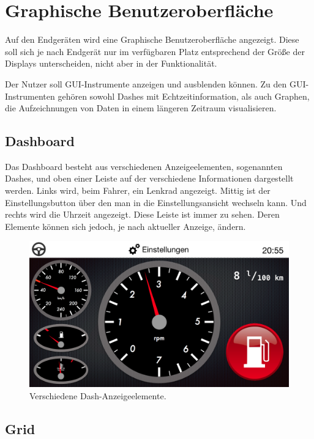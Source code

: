 \documentclass[pflichtenheft.tex]{subfiles}
\begin{document}
\chapter{Graphische Benutzeroberfläche}
Auf den Endgeräten wird eine Graphische Benutzeroberfläche angezeigt. Diese soll sich je nach Endgerät nur im verfügbaren Platz entsprechend der Größe der Displays unterscheiden, nicht aber in der Funktionalität.

Der Nutzer soll GUI-Instrumente anzeigen und ausblenden können. Zu den GUI-Instrumenten gehören sowohl Dashes mit Echtzeitinformation, als auch Graphen, die Aufzeichnungen von Daten in einem längeren Zeitraum visualisieren.


\section{Dashboard}

Das Dashboard besteht aus verschiedenen Anzeigeelementen, sogenannten Dashes, und oben einer Leiste auf der verschiedene Informationen dargestellt werden. Links wird, beim Fahrer, ein Lenkrad angezeigt. Mittig ist der Einstellungsbutton über den man in die Einstellungsansicht wechseln kann. Und rechts wird die Uhrzeit angezeigt. Diese Leiste ist immer zu sehen. Deren Elemente können sich jedoch, je nach aktueller Anzeige, ändern.

\begin{figure}[H]
  	\begin{center}
 		\includegraphics[width=\textwidth]{Images/GUI-Dashboard.png}
  		\caption{Verschiedene Dash-Anzeigeelemente.}
  	\end{center}
\end{figure}

\clearpage
\section{Grid}
\end{document}
